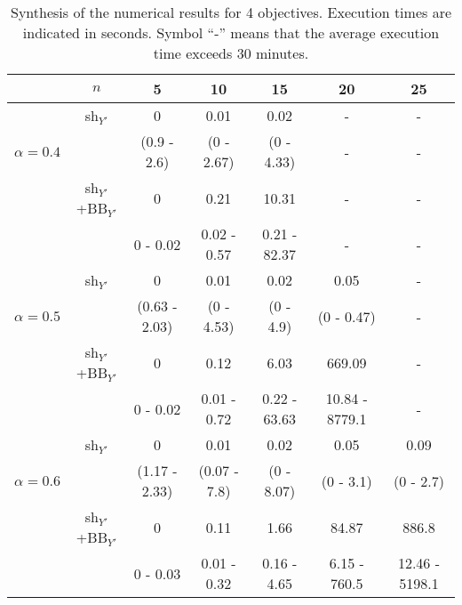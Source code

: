 \documentclass[final,3p,times]{elsarticle}
\begin{document}
\begin{table}[!h]
  \begin{center}
  {\small \begin{tabular}{|c|c|ccccc|}
    \hline
       \rule[1pt]{0pt}{13pt} 
       &$n$ & 5&10&15&20&25\\
       \hline
     \hline
    & sh$_{Y'}$&0&0.01&0.02&-&-\\
       $\alpha = 0.4$   & &(0.9 - 2.6)&(0 - 2.67)&(0 - 4.33)& - & - \\

       \cline{2-7} 
       &sh$_{Y'}$+BB$_{Y'}$&0&0.21&10.31&-&-\\
       &  &0 - 0.02&0.02 - 0.57&0.21 - 82.37& - & - \\
  \hline
  \hline
   & sh$_{Y'}$&0&0.01&0.02&0.05&-\\
$\alpha = 0.5$  & &(0.63 - 2.03)&(0 - 4.53)&(0 - 4.9)&(0 - 0.47)& - \\

    \cline{2-7} 
 &sh$_{Y'}$+BB$_{Y'}$&0&0.12&6.03&669.09&-\\
  &  &0 - 0.02&0.01 - 0.72&0.22 - 63.63&10.84 - 8779.1& - \\
  \hline
  \hline
  & sh$_{Y'}$&0&0.01&0.02&0.05&0.09\\
  $\alpha = 0.6$  & &(1.17 - 2.33)&(0.07 - 7.8)&(0 - 8.07)&(0 - 3.1)&(0 - 2.7)\\
  \cline{2-7} 
  &sh$_{Y'}$+BB$_{Y'}$&0&0.11&1.66&84.87&886.8\\
  &  &0 - 0.03&0.01 - 0.32&0.16 - 4.65&6.15 - 760.5&12.46 - 5198.1\\
  \hline
    \end{tabular}
}
\end{center}
\caption{\label{tabPL5} Synthesis of the numerical results for 4 objectives. Execution times are
  indicated in seconds. Symbol ``-'' means that the average execution time exceeds 30 minutes.}
\end{table}
\end{document}
